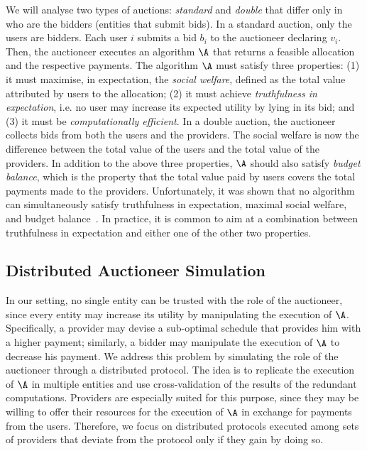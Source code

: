 We will analyse two types of auctions: \emph{standard} and \emph{double}
that differ only in who are the bidders (entities that submit bids).
In a standard auction, only the users are bidders.
Each user $i$ submits a bid $b_i$ to the auctioneer declaring $v_i$.
Then, the auctioneer executes an algorithm $\A$ that
returns a feasible allocation and the respective payments.
The algorithm $\A$ must satisfy three properties: (1) it must maximise, in expectation, 
the \emph{social welfare}, defined as the total value attributed by users to the allocation;
(2) it must achieve \emph{truthfulness in expectation}, i.e.
no user may increase its expected utility by lying in its bid;
and (3) it must be \emph{computationally efficient}.
In a double auction, 
the auctioneer collects bids from both the users and the providers.
The social welfare is now the
difference between the total value of the users and the total 
value of the providers. In addition to the above three
properties, $\A$ should also satisfy
\emph{budget balance}, which is the property that the total
value paid by users covers the total payments made to the providers.
Unfortunately, it was shown that no algorithm can simultaneously satisfy
truthfulness in expectation, maximal social welfare, and budget balance~\cite{Myerson1983}.
In practice, it is common to aim at a combination between
truthfulness in expectation and either one of the other two properties.

\subsection{Distributed Auctioneer Simulation}
In our setting, no single entity can be trusted with the role of the auctioneer,
since every entity may increase its utility by manipulating the execution of $\A$.
Specifically, a provider may devise a sub-optimal schedule
that provides him with a higher payment; similarly, a bidder
may manipulate the execution of $\A$ to decrease his payment.
We address this problem by simulating the role of the auctioneer through a distributed protocol.
The idea is to replicate the execution of $\A$ in multiple entities
and use cross-validation of the results of the redundant computations.
Providers are especially suited for this purpose, since they may be willing
to offer their resources for the execution of $\A$ in exchange for payments 
from the users.
Therefore, we focus on distributed protocols executed among sets
of providers that deviate from the protocol only if they gain by doing so.

